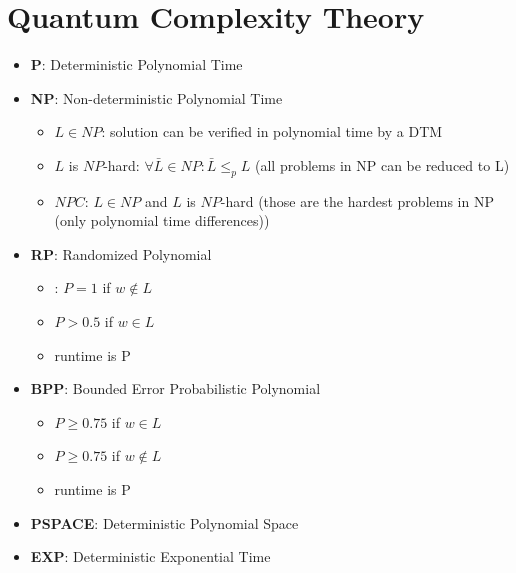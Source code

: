 \documentclass[12pt,a4paper]{article}
\begin{document}
\section{Quantum Complexity Theory}
\begin{itemize}
\item \textbf{P}: Deterministic Polynomial Time
\item \textbf{NP}: Non-deterministic Polynomial Time
\begin{itemize}
\item $L\in NP$: solution can be verified in polynomial time by a DTM
\item $L$ is $NP$-hard: $\forall \bar{L}\in NP: \bar{L} \leq_p L$ (all problems in NP can be reduced to L)
\item $NPC$: $L\in NP$ and $L$ is $NP$-hard (those are the hardest problems in NP (only polynomial time differences)) 
\end{itemize}
\item \textbf{RP}: Randomized Polynomial
\begin{itemize}
\item: $P=1$ if $w\not\in L$
\item $P>0.5$ if $w\in L$
\item runtime is P
\end{itemize}
\item \textbf{BPP}: Bounded Error Probabilistic Polynomial
\begin{itemize}
\item $P\geq 0.75$ if $w\in L$
\item $P\geq 0.75$ if $w\not\in L$
\item runtime is P
\end{itemize}
\item \textbf{PSPACE}: Deterministic Polynomial Space
\item \textbf{EXP}: Deterministic Exponential Time


\end{itemize}
\end{document}
